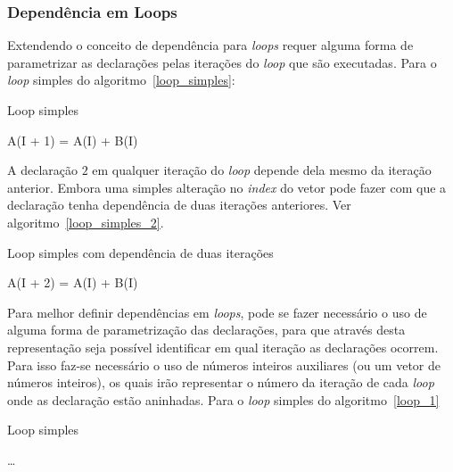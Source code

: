 \subsubsection{Dependência em Loops}

Extendendo o conceito de dependência para \textit{loops} requer alguma forma de
parametrizar as declarações pelas iterações do \textit{loop} que são
executadas.
Para o \textit{loop} simples do algoritmo~\ref{loop_simples}:

\begin{algorithm}
        \caption{Loop simples}
        \label{loop_simples}
        \begin{algorithmic}[1]
                \STATE A(I + 1) = A(I) + B(I) 
        \ENDFOR
        \end{algorithmic}
\end{algorithm}

A declaração $2$ em qualquer iteração do \textit{loop} depende dela mesmo da
iteração anterior. Embora uma simples alteração no \textit{index} do vetor pode
fazer com que a declaração tenha dependência de duas iterações anteriores.
Ver algoritmo~\ref{loop_simples_2}.

\begin{algorithm}
        \caption{Loop simples com dependência de duas iterações}
        \label{loop_simples_2}
        \begin{algorithmic}[1]
                \STATE A(I + 2) = A(I) + B(I) 
        \ENDFOR
        \end{algorithmic}
\end{algorithm}

Para melhor definir dependências em \textit{loops},  pode se fazer necessário o
uso de alguma forma de parametrização das declarações, para que através desta
representação seja possível identificar em qual iteração as declarações ocorrem.
Para isso faz-se necessário o uso de números inteiros auxiliares (ou um vetor de
números inteiros), os quais irão representar o número da iteração de cada 
\textit{loop} onde as declaração estão aninhadas.
Para o \textit{loop} simples do algoritmo~\ref{loop_1}

\begin{algorithm}
        \caption{Loop simples}
        \label{loop_1}
        \begin{algorithmic}[1]
                \STATE \ldots
                \ENDFOR
        \end{algorithmic}
\end{algorithm}

